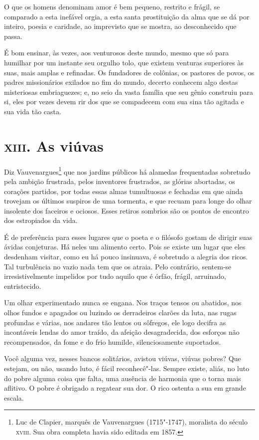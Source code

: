 O que os homens denominam amor é bem pequeno, restrito e frágil, se 
comparado a esta inefável orgia, a esta santa prostituição da alma
que se dá por inteiro, poesia e caridade, ao imprevisto que se mostra, ao
desconhecido que passa.


É bom ensinar, às vezes, aos venturosos deste mundo, mesmo que só para
humilhar por um instante seu orgulho tolo, que existem venturas
superiores às suas, mais amplas e refinadas. Os fundadores de colônias,
os pastores de povos, os padres missionários exilados no fim do mundo,
decerto conhecem algo destas misteriosas embriaguezes; e, no seio da
vasta família que seu gênio construiu para si, eles por vezes devem rir
dos que se compadecem com sua sina tão agitada e sua vida tão
casta.

\chapter{\textsc{xiii.} As viúvas}

Diz Vauvenargues\footnote{
 Luc de Clapier, marquês de Vauvenargues (1715"-1747), moralista do
século \textsc{xviii}. Sua obra completa havia sido editada em 1857.}
 que nos jardins públicos há
alamedas frequentadas sobretudo pela ambição frustrada, pelos
inventores frustrados, as glórias abortadas, os corações partidos,
por todas essas almas tumultuosas e fechadas em que ainda trovejam
os últimos suspiros de uma tormenta, e que recuam para longe do olhar
insolente dos faceiros e ociosos. Esses retiros sombrios são os
pontos de encontro dos estropiados da vida.

É de preferência para esses lugares que o poeta e o filósofo gostam de
dirigir suas ávidas conjeturas. Há neles um alimento certo. Pois se
existe um lugar que eles desdenham visitar, como eu há pouco insinuava,
é sobretudo a alegria dos ricos. Tal turbulência no vazio nada tem que
os atraia. Pelo contrário, sentem-se irresistivelmente impelidos
por tudo aquilo que é órfão, frágil, arruinado, entristecido.

Um olhar experimentado nunca se engana. Nos traços tensos ou
abatidos, nos olhos fundos e apagados ou luzindo os derradeiros clarões
da luta, nas rugas profundas e várias, nos andares tão
lentos ou sôfregos, ele logo decifra as incontáveis lendas do amor
traído, da afeição desagradecida, dos esforços não recompensados, da
fome e do frio humilde, silenciosamente suportados.

Você alguma vez, nesses bancos solitários, avistou viúvas, viúvas
pobres? Que estejam, ou não, usando luto, é fácil reconhecê"-las. Sempre existe, aliás, no luto do pobre alguma coisa que falta, uma ausência de
harmonia que o torna mais aflitivo. O pobre é obrigado a regatear sua dor. O
rico ostenta a sua em grande escala.

